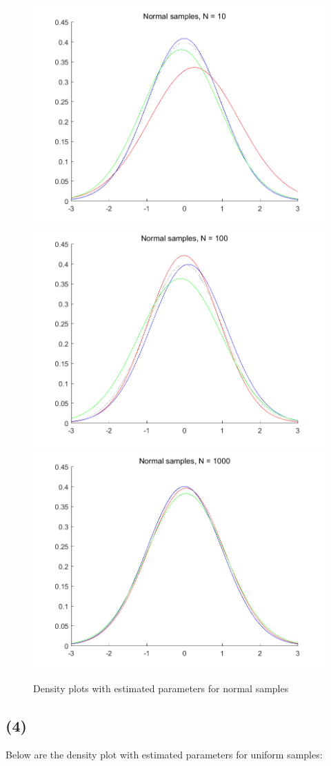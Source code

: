 \documentclass{article}
\begin{document}
{{        \begin{figure}[H]
            \centering
            \includegraphics[width = 0.6\linewidth]{normal_10.png}
            \includegraphics[width = 0.6\linewidth]{normal_100.png}
            \includegraphics[width = 0.6\linewidth]{normal_1000.png}
            \caption{Density plots with estimated parameters for normal samples}
        \end{figure}
    }

    \subsection*{(4)}
    {
        Below are the density plot with estimated parameters for uniform samples:

}}
\end{document}
